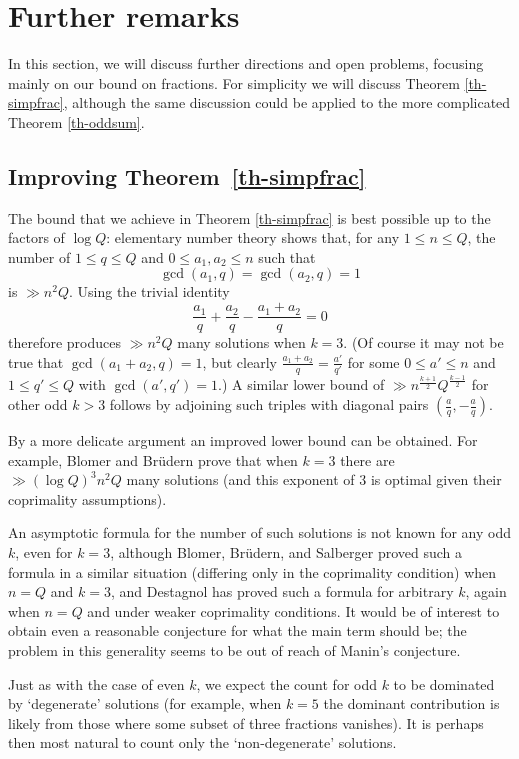 \documentclass[11pt,letterpaper]{amsart}
\newcommand{\ogcd}[2]{\gcd(#1,#2)}
\theoremstyle{definition}
\begin{document}

\section{Further remarks}\label{sec-problems}

In this section, we will discuss further directions and open problems, focusing mainly on our bound on fractions. For simplicity we will discuss Theorem \ref{th-simpfrac}, although the same discussion could be applied to the more complicated Theorem \ref{th-oddsum}.

\subsection{Improving Theorem~\ref{th-simpfrac}}
The bound that we achieve in Theorem \ref{th-simpfrac} is best possible up to the factors of $\log Q$: elementary number theory shows that, for any $1\leq n\leq Q$, the number of $1\leq q\leq Q$ and $0\leq a_1,a_2\leq n$ such that 
\[\ogcd{a_1}{q}=\ogcd{a_2}{q}=1\]
is $\gg n^2Q$. Using the trivial identity
\[\frac{a_1}{q}+\frac{a_2}{q}-\frac{a_1+a_2}{q}=0\]
therefore produces $\gg n^2Q$ many solutions when $k=3$. (Of course it may not be true that $\ogcd{a_1+a_2}{q}=1$, but clearly $\tfrac{a_1+a_2}{q}=\tfrac{a'}{q'}$ for some $0\leq a'\leq n$ and $1\leq q'\leq Q$ with $\ogcd{a'}{q'}=1$.) A similar lower bound of $\gg n^{\frac{k+1}{2}}Q^{\frac{k-1}{2}}$ for other odd $k>3$ follows by adjoining such triples with diagonal pairs $(\tfrac{a}{q},-\tfrac{a}{q})$.

By a more delicate argument an improved lower bound can be obtained. For example, Blomer and Br\"{u}dern \cite{BB} prove that when $k=3$ there are $\gg (\log Q)^{3}n^2Q$ many solutions (and this exponent of $3$ is optimal given their coprimality assumptions). 

An asymptotic formula for the number of such solutions is not known for any odd $k$, even for $k=3$, although Blomer, Br\"{u}dern, and Salberger \cite{BBS} proved such a formula in a similar situation (differing only in the coprimality condition) when $n=Q$ and $k=3$, and Destagnol \cite{De} has proved such a formula for arbitrary $k$, again when $n=Q$ and under weaker coprimality conditions. It would be of interest to obtain even a reasonable conjecture for what the main term should be; the problem in this generality seems to be out of reach of Manin's conjecture.

Just as with the case of even $k$, we expect the count for odd $k$ to be dominated by `degenerate' solutions (for example, when $k=5$ the dominant contribution is likely from those where some subset of three fractions vanishes). It is perhaps then most natural to count only the `non-degenerate' solutions. 
\end{document}
